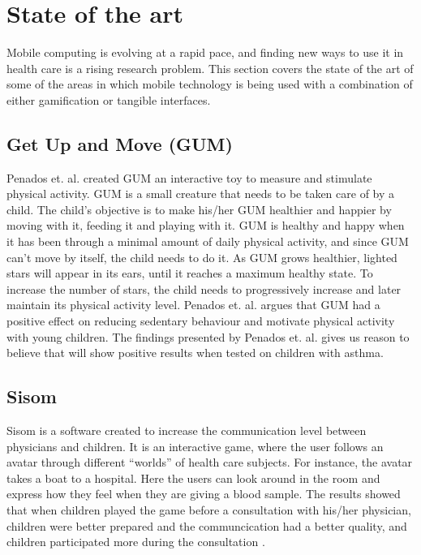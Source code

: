 \section{State of the art}
Mobile computing is evolving at a rapid pace, and finding new ways to use it in health care is a rising research problem. This section covers the state of the art of some of the areas in which mobile technology is being used with a combination of either gamification or tangible interfaces.   


\subsection{Get Up and Move (GUM)}
Penados et. al.\cite{penadosget} created GUM an interactive toy to measure and stimulate physical activity. GUM is a small creature that needs to be taken care of by a child. The child's objective is to make his/her GUM healthier and happier by moving with it, feeding it and playing with it. GUM is healthy and happy when it has been through a minimal amount of daily physical activity, and since GUM can't move by itself, the child needs to do it. As GUM grows healthier, lighted stars will appear in its ears, until it reaches a maximum healthy state. To increase the number of stars, the child needs to progressively increase and later maintain its physical activity level. Penados et. al. argues that GUM had a positive effect on reducing sedentary behaviour and motivate physical activity with young children. The findings presented by Penados et. al. \cite{penadosget} gives us reason to believe that \buddy{} will show positive results when tested on children with asthma. 


\subsection{Sisom}
Sisom is a software created to increase the communication level between physicians and children. It is an interactive game, where the user follows an avatar through different ``worlds'' of health care subjects. For instance, the avatar takes a boat to a hospital. Here the users can look around in the room and express how they feel when they are giving a blood sample. The results showed that when children played the game before a consultation with his/her physician, children were better prepared and the communcication had a better quality, and children participated more during the consultation \cite{sisom-research}.



